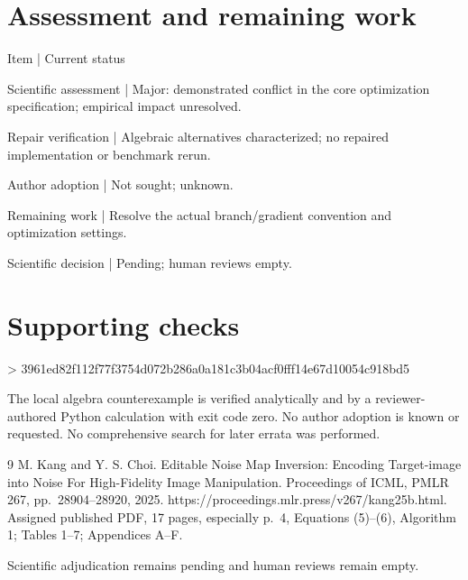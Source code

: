 \documentclass[10pt]{article}
\begin{document}
\section*{Assessment and remaining work}
Item | Current status\par
Scientific assessment | Major: demonstrated conflict in the core optimization specification; empirical impact unresolved.\par
Repair verification | Algebraic alternatives characterized; no repaired implementation or benchmark rerun.\par
Author adoption | Not sought; unknown.\par
Remaining work | Resolve the actual branch/gradient convention and optimization settings.\par
Scientific decision | Pending; human reviews empty.\par
\section*{Supporting checks}
> 3961ed82f112f77f3754d072b286a0a181c3b04acf0fff14e67d10054c918bd5\par
The local algebra counterexample is verified analytically and by a reviewer-authored Python calculation with exit code zero. No author adoption is known or requested. No comprehensive search for later errata was performed.\par
9 M. Kang and Y. S. Choi. Editable Noise Map Inversion: Encoding Target-image into Noise For High-Fidelity Image Manipulation. Proceedings of ICML, PMLR 267, pp. 28904–28920, 2025. https://proceedings.mlr.press/v267/kang25b.html. Assigned published PDF, 17 pages, especially p. 4, Equations (5)–(6), Algorithm 1; Tables 1–7; Appendices A–F.\par
Scientific adjudication remains pending and human reviews remain empty.\par
\end{document}
